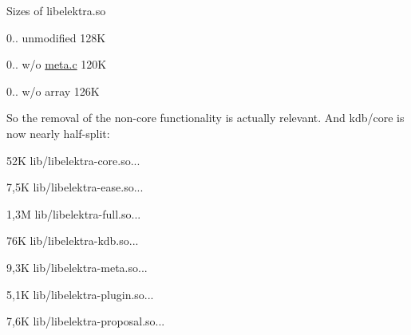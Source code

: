 Sizes of libelektra.\+so


\begin{DoxyItemize}
\item 0.. unmodified 128\+K
\item 0.. w/o \hyperlink{meta_8c}{meta.\+c} 120\+K
\item 0.. w/o array 126\+K
\end{DoxyItemize}

So the removal of the non-\/core functionality is actually relevant. And kdb/core is now nearly half-\/split\+:


\begin{DoxyItemize}
\item 52\+K lib/libelektra-\/core.\+so...
\item 7,5\+K lib/libelektra-\/ease.\+so...
\item 1,3\+M lib/libelektra-\/full.\+so...
\item 76\+K lib/libelektra-\/kdb.\+so...
\item 9,3\+K lib/libelektra-\/meta.\+so...
\item 5,1\+K lib/libelektra-\/plugin.\+so...
\item 7,6\+K lib/libelektra-\/proposal.\+so... 
\end{DoxyItemize}